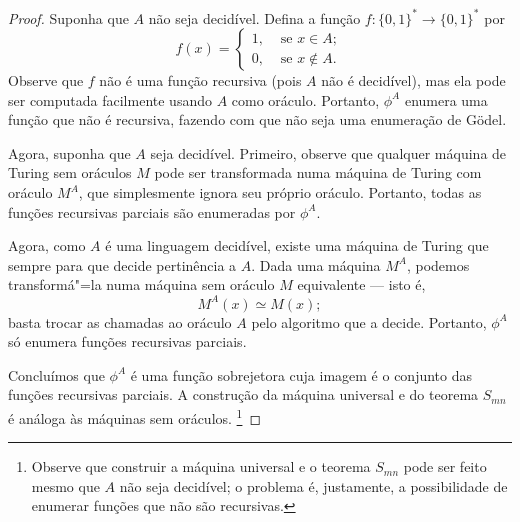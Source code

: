 \begin{proof}
    Suponha que $A$ não seja decidível.
    Defina a função $f: \{0, 1\}^* \to \{0, 1\}^*$ por
    \begin{equation*}
        f(x) =
        \begin{cases}
            1,& \text{ se } x \in A; \\
            0,& \text{ se } x \notin A.
        \end{cases}
    \end{equation*}
    Observe que $f$ não é uma função recursiva
    (pois $A$ não é decidível),
    mas ela pode ser computada facilmente usando $A$ como oráculo.
    Portanto, $\phi^A$ enumera uma função que não é recursiva,
    fazendo com que não seja uma enumeração de Gödel.

    Agora, suponha que $A$ seja decidível.
    Primeiro,
    observe que qualquer máquina de Turing sem oráculos $M$
    pode ser transformada numa máquina de Turing com oráculo $M^A$,
    que simplesmente ignora seu próprio oráculo.
    Portanto,
    todas as funções recursivas parciais são enumeradas por $\phi^A$.

    Agora,
    como $A$ é uma linguagem decidível,
    existe uma máquina de Turing que sempre para que decide pertinência a $A$.
    Dada uma máquina $M^A$,
    podemos transformá"=la numa máquina sem oráculo $M$
    equivalente --- isto é,
    \begin{equation*}
        M^A(x) \simeq M(x);
    \end{equation*}
    basta trocar as chamadas ao oráculo $A$
    pelo algoritmo que a decide.
    Portanto, $\phi^A$ só enumera funções recursivas parciais.

    Concluímos que $\phi^A$ é uma função sobrejetora
    cuja imagem é o conjunto das funções recursivas parciais.
    A construção da máquina universal
    e do teorema $S_{mn}$ é análoga às máquinas sem oráculos.%
    \footnote{
        Observe que construir a máquina universal
        e o teorema $S_{mn}$ pode ser feito mesmo que $A$ não seja decidível;
        o problema é, justamente,
        a possibilidade de enumerar funções que não são recursivas.
    }
\end{proof}
